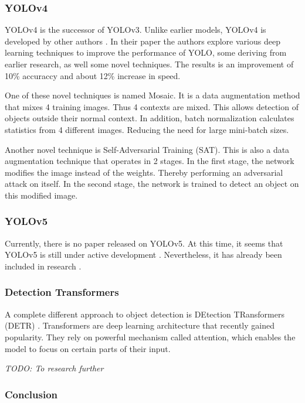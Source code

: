 \subsubsection{YOLOv4}

YOLOv4 is the successor of YOLOv3. Unlike earlier models, YOLOv4 is developed by other authors \cite{Bochkovskiy2020}. In their paper the authors explore various deep learning techniques to improve the performance of YOLO, some deriving from earlier research, as well some novel techniques. The results is an improvement of 10\% accuraccy and about 12\% increase in speed.

One of these novel techniques is named Mosaic. It is a data augmentation method that mixes 4 training images. Thus 4 contexts are mixed. This allows detection of objects outside their normal context. In addition, batch normalization calculates statistics from 4 different images. Reducing the need for large mini-batch sizes.

Another novel technique is Self-Adversarial Training (SAT). This is also a data augmentation technique that operates in 2 stages. In the first stage, the network modifies the image instead of the weights. Thereby performing an adversarial attack on itself. In the second stage, the network is trained to detect an object on this modified image.


\subsubsection{YOLOv5}

Currently, there is no paper released on YOLOv5. At this time, it seems that YOLOv5 is still under active development \cite{Jocher2021}. Nevertheless, it has already been included in research \cite{Arya2020-competition}.


\subsubsection{Detection Transformers}

A complete different approach to object detection is DEtection TRansformers (DETR) \cite{Carion2020}. Transformers are deep learning architecture that recently gained popularity. They rely on powerful mechanism called attention, which enables the model to focus on certain parts of their input. 

\textit{TODO: To research further}


\subsubsection{Conclusion}


